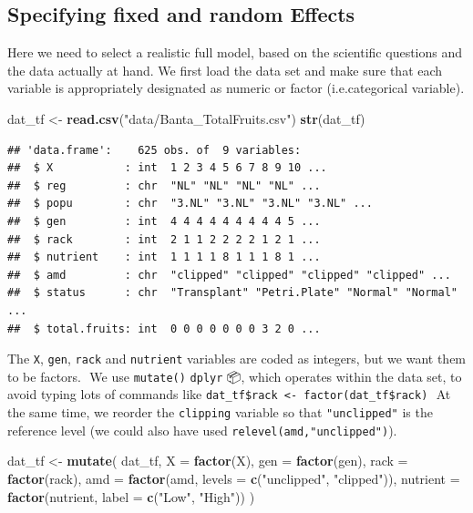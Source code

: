 \documentclass[
  12pt,
]{book}
\newenvironment{Shaded}{\begin{snugshade}}{\end{snugshade}}
\newcommand{\DataTypeTok}[1]{\textcolor[rgb]{0.13,0.29,0.53}{#1}}
\newcommand{\KeywordTok}[1]{\textcolor[rgb]{0.13,0.29,0.53}{\textbf{#1}}}
\newcommand{\NormalTok}[1]{#1}
\newcommand{\StringTok}[1]{\textcolor[rgb]{0.31,0.60,0.02}{#1}}
\begin{document}
\hypertarget{specifying-fixed-and-random-effects}{%
\subsection{Specifying fixed and random Effects}\label{specifying-fixed-and-random-effects}}

Here we need to select a realistic full model, based on the scientific questions and the data actually at hand. We first load the data set and make sure that each variable is appropriately designated as numeric or factor (i.e.categorical variable).

\begin{Shaded}
\begin{Highlighting}[]
\NormalTok{dat\_tf \textless{}{-}}\StringTok{ }\KeywordTok{read.csv}\NormalTok{(}\StringTok{"data/Banta\_TotalFruits.csv"}\NormalTok{)}
\KeywordTok{str}\NormalTok{(dat\_tf)}
\end{Highlighting}
\end{Shaded}

\begin{verbatim}
## 'data.frame':    625 obs. of  9 variables:
##  $ X           : int  1 2 3 4 5 6 7 8 9 10 ...
##  $ reg         : chr  "NL" "NL" "NL" "NL" ...
##  $ popu        : chr  "3.NL" "3.NL" "3.NL" "3.NL" ...
##  $ gen         : int  4 4 4 4 4 4 4 4 4 5 ...
##  $ rack        : int  2 1 1 2 2 2 2 1 2 1 ...
##  $ nutrient    : int  1 1 1 1 8 1 1 1 8 1 ...
##  $ amd         : chr  "clipped" "clipped" "clipped" "clipped" ...
##  $ status      : chr  "Transplant" "Petri.Plate" "Normal" "Normal" ...
##  $ total.fruits: int  0 0 0 0 0 0 0 3 2 0 ...
\end{verbatim}

The \texttt{X}, \texttt{gen}, \texttt{rack} and \texttt{nutrient} variables are coded as integers, but we want them to be factors.
 We use \texttt{mutate()} \texttt{dplyr} 📦, which operates within the data set, to avoid typing lots of commands like \texttt{dat\_tf\$rack\ \textless{}-\ factor(dat\_tf\$rack)}
 At the same time, we reorder the \texttt{clipping} variable so that \texttt{"unclipped"} is the reference level (we could also have used \texttt{relevel(amd,"unclipped")}).

\begin{Shaded}
\begin{Highlighting}[]
\NormalTok{dat\_tf \textless{}{-}}\StringTok{ }\KeywordTok{mutate}\NormalTok{(}
\NormalTok{  dat\_tf,}
  \DataTypeTok{X =} \KeywordTok{factor}\NormalTok{(X),}
  \DataTypeTok{gen =} \KeywordTok{factor}\NormalTok{(gen),}
  \DataTypeTok{rack =} \KeywordTok{factor}\NormalTok{(rack),}
  \DataTypeTok{amd =} \KeywordTok{factor}\NormalTok{(amd, }\DataTypeTok{levels =} \KeywordTok{c}\NormalTok{(}\StringTok{"unclipped"}\NormalTok{, }\StringTok{"clipped"}\NormalTok{)),}
  \DataTypeTok{nutrient =} \KeywordTok{factor}\NormalTok{(nutrient, }\DataTypeTok{label =} \KeywordTok{c}\NormalTok{(}\StringTok{"Low"}\NormalTok{, }\StringTok{"High"}\NormalTok{))}
\NormalTok{)}
\end{Highlighting}
\end{Shaded}
\end{document}
